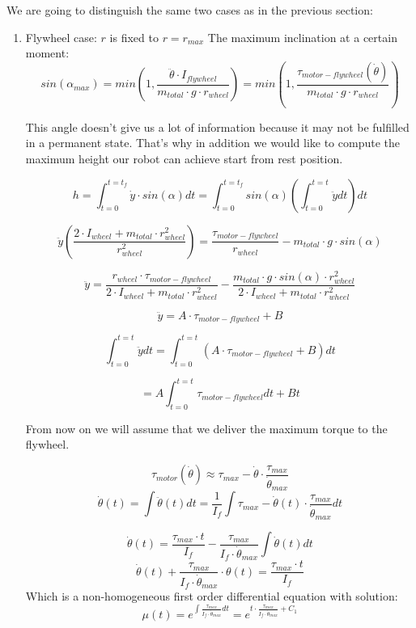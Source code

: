 We are going to distinguish the same two cases as in the previous section:
\begin{enumerate}
    \item Flywheel case: $r$ is fixed to $r = r_{max}$
    The maximum inclination at a certain moment:
    \begin{equation}\label{Maximum angle using flywheel system}
        \boxed{sin(\alpha_{max}) = min(1,\frac{\ddot{\theta}\cdot I_{flywheel}}{m_{total} \cdot  g \cdot  r_{wheel}}) = min(1,\frac{\tau_{motor-flywheel}(\dot{\theta})}{m_{total} \cdot  g \cdot  r_{wheel}})}
    \end{equation}


    This angle doesn't give us a lot of information because it may not be fulfilled in a 
    permanent state. That's why in addition we would like to compute the maximum height
    our robot can achieve start from rest position.

    \[h=\int_{t=0}^{t=t_f} \dot{y}\cdot sin(\alpha) dt =\int_{t=0}^{t=t_f} sin(\alpha) (\int_{t=0}^{t=t} \ddot{y} dt)dt \]

    \[\ddot{y}(\frac{2\cdot I_{wheel}+ m_{total} \cdot r^2_{wheel} }{r^2_{wheel}}) =  \frac{\tau_{motor-flywheel}}{r_{wheel}} - m_{total} \cdot g \cdot sin(\alpha)\]

    \[\ddot{y}=
    \frac{r_{wheel}\cdot\tau_{motor-flywheel}}{2\cdot I_{wheel}+ m_{total} \cdot r^2_{wheel}}
    - \frac{m_{total} \cdot g \cdot sin(\alpha)\cdot r^2_{wheel}}{2\cdot I_{wheel}+ m_{total} \cdot r^2_{wheel}}\]

    \[\ddot{y}=A\cdot \tau_{motor-flywheel} + B\]

    \[\int_{t=0}^{t=t} \ddot{y} dt = \int_{t=0}^{t=t} (A\cdot \tau_{motor-flywheel} + B) dt\]


    \[=A\int_{t=0}^{t=t} \tau_{motor-flywheel} dt + B t \]

    From now on we will assume that we deliver the maximum torque to the flywheel.


    \[\tau_{motor}(\dot{\theta}) \approx \tau_{max}- \dot{\theta}\cdot\frac{\tau_{max}}{\dot{\theta}_{max}}\]
    \[\dot{\theta}(t)=\int \ddot{\theta}(t) dt
    = \frac{1}{I_f} \int \tau_{max}- \dot{\theta}(t)\cdot\frac{\tau_{max}}{\dot{\theta}_{max}} dt \]

    \[\dot{\theta}(t) = \frac{\tau_{max}\cdot t}{I_f} - \frac{\tau_{max}}{I_f \cdot \dot{\theta}_{max}}\int \dot{\theta}(t) dt \]
    \[\dot{\theta}(t) + \frac{\tau_{max}}{I_f \cdot \dot{\theta}_{max}}\cdot \theta(t) = \frac{\tau_{max}\cdot t}{I_f} \]
    Which is a non-homogeneous first order differential equation with solution:
    \begin{equation*}
        \mu(t) = e^{\int \frac{\tau_{max}}{I_f \cdot \dot{\theta}_{max}} dt} = e^{t\cdot \frac{\tau_{max}}{I_f \cdot \dot{\theta}_{max}}+C_1}
    \end{equation*}


\end{enumerate}
